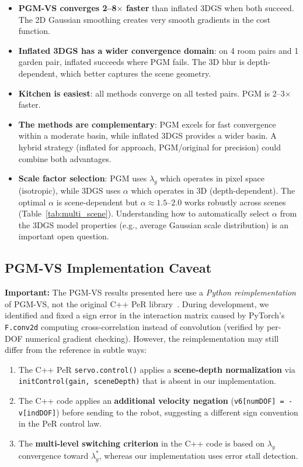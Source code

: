 \documentclass[11pt]{article}
\begin{document}
\begin{itemize}
    \item \textbf{PGM-VS converges 2--8$\times$ faster} than inflated 3DGS when both succeed. The 2D Gaussian smoothing creates very smooth gradients in the cost function.
    \item \textbf{Inflated 3DGS has a wider convergence domain}: on 4 room pairs and 1 garden pair, inflated succeeds where PGM fails. The 3D blur is depth-dependent, which better captures the scene geometry.
    \item \textbf{Kitchen is easiest}: all methods converge on all tested pairs. PGM is 2--3$\times$ faster.
    \item \textbf{The methods are complementary}: PGM excels for fast convergence within a moderate basin, while inflated 3DGS provides a wider basin. A hybrid strategy (inflated for approach, PGM/original for precision) could combine both advantages.
    \item \textbf{Scale factor selection}: PGM uses $\lambda_g$ which operates in pixel space (isotropic), while 3DGS uses $\alpha$ which operates in 3D (depth-dependent). The optimal $\alpha$ is scene-dependent but $\alpha \approx 1.5$--$2.0$ works robustly across scenes (Table~\ref{tab:multi_scene}). Understanding how to automatically select $\alpha$ from the 3DGS model properties (e.g., average Gaussian scale distribution) is an important open question.
\end{itemize}

\subsection{PGM-VS Implementation Caveat}
\label{sec:pgm_caveat}

\textbf{Important:} The PGM-VS results presented here use a \emph{Python reimplementation} of PGM-VS, not the original C++ PeR library~\cite{crombez2019tro}. During development, we identified and fixed a sign error in the interaction matrix caused by PyTorch's \texttt{F.conv2d} computing cross-correlation instead of convolution (verified by per-DOF numerical gradient checking). However, the reimplementation may still differ from the reference in subtle ways:

\begin{enumerate}
    \item The C++ PeR \texttt{servo.control()} applies a \textbf{scene-depth normalization} via \texttt{initControl(gain, sceneDepth)} that is absent in our implementation.
    \item The C++ code applies an \textbf{additional velocity negation} (\texttt{v6[numDOF] = -v[indDOF]}) before sending to the robot, suggesting a different sign convention in the PeR control law.
    \item The \textbf{multi-level switching criterion} in the C++ code is based on $\lambda_g$ convergence toward $\lambda_g^*$, whereas our implementation uses error stall detection.
\end{enumerate}
\end{document}
